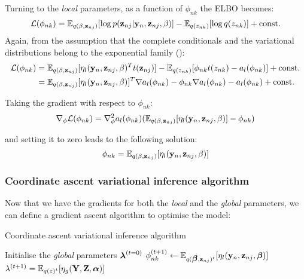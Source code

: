 Turning to the \textit{local} parameters, as a function of $\phi_{nk}$ the ELBO becomes:
\[
	\mathcal{L}(\phi_{nk}) = \mathbb{E}_{q(\beta,{\bf z}_{nj})}[\log p({\bf z}_{nj}|{\bf y}_{n},{\bf z}_{nj}, \beta)] - \mathbb{E}_{q(z_{nk})}[\log q(z_{nk})] + {\rm const.}
\]
Again, from the assumption that the complete conditionals and the variational distributions belong to the exponential family ():
\begin{align*}
	\mathcal{L}(\phi_{nk}) &= \mathbb{E}_{q(\beta,{\bf z}_{nj})}[\eta_l({\bf y}_n,{\bf z}_{nj},\beta)^T t({\bf z}_{nj})] - \mathbb{E}_{q(z_{nk})}[\phi_{nk} t(z_{nk}) - a_l(\phi_{nk}) ] + {\rm const.} \\
	&= \mathbb{E}_{q(\beta,{\bf z}_{nj})}[\eta_l({\bf y}_n,{\bf z}_{nj},\beta)]^T \nabla a_l(\phi_{nk}) - \phi_{nk} \nabla a_l(\phi_{nk}) - a_l(\phi_{nk}) + {\rm const.}
\end{align*}

Taking the gradient with respect to $\phi_{nk}$:
\begin{equation} \label{gradient_local}
	\nabla_{\phi} \mathcal{L}(\phi_{nk}) = \nabla_{\phi}^2 a_l(\phi_{nk}) (\mathbb{E}_{q(\beta,{\bf z}_{nj})}[\eta_l({\bf y}_n,{\bf z}_{nj},\beta)] - \phi_{nk})
\end{equation}

and setting it to zero leads to the following solution:
\begin{equation} \label{solution_local}
	\phi_{nk} = \mathbb{E}_{q(\beta,{\bf z}_{nj})}[\eta_l({\bf y}_{n},{\bf z}_{nj},\beta)]
\end{equation}


\subsubsection{Coordinate ascent variational inference algorithm}

Now that we have the gradients for both the \textit{local} and the \textit{global} parameters, we can define a gradient ascent algorithm to optimise the model:

\begin{algorithm*}
  \caption{Coordinate ascent variational inference algorithm}
  \begin{algorithmic}[1]
	\State Initialise the \textit{global} parameters $\mbox{\boldmath $\lambda$}^{(t=0)}$
	\Repeat
			\State $ \phi_{nk}^{(t+1)} \gets \mathbb{E}_{q(\mbox{\boldmath $\beta$},{\bf z}_{nj})^t}[\eta_l({\bf y}_{n},{\bf z}_{nj},\mbox{\boldmath $\beta$})] $
      	\EndFor
			\State $ \lambda^{(t+1)}= \mathbb{E}_{q(z)^t}[\eta_g({\bf Y},{\bf Z},\mbox{\boldmath $\alpha$})] $
      	\EndFor
	\end{algorithmic}
\end{algorithm*}

